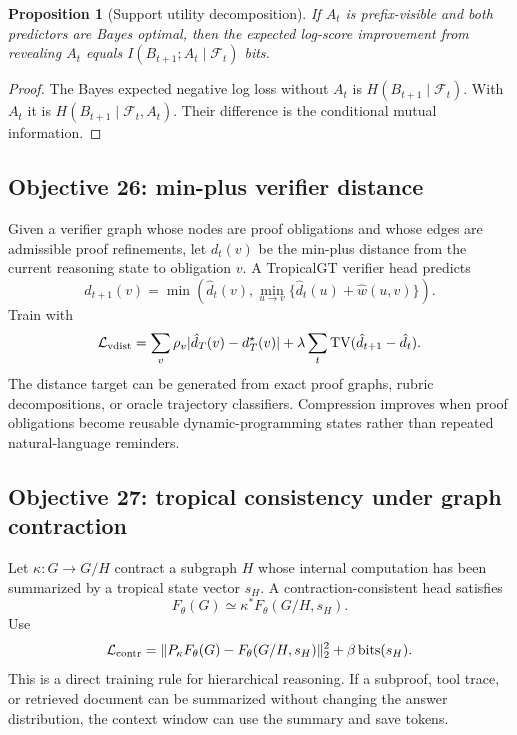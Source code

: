 \documentclass[11pt]{article}
\newtheorem{proposition}[definition]{Proposition}
\newcommand{\calL}{\mathcal{L}}
\newcommand{\calF}{\mathcal{F}}
\begin{document}
\begin{proposition}[Support utility decomposition]
If $A_t$ is prefix-visible and both predictors are Bayes optimal, then the expected log-score improvement from revealing $A_t$ equals $I(B_{t+1};A_t\mid\calF_t)$ bits.
\end{proposition}
\begin{proof}
The Bayes expected negative log loss without $A_t$ is $H(B_{t+1}\mid\calF_t)$. With $A_t$ it is $H(B_{t+1}\mid\calF_t,A_t)$. Their difference is the conditional mutual information.
\end{proof}

\subsection{Objective 26: min-plus verifier distance}
Given a verifier graph whose nodes are proof obligations and whose edges are admissible proof refinements, let $d_t(v)$ be the min-plus distance from the current reasoning state to obligation $v$. A TropicalGT verifier head predicts
\begin{equation}
\hat d_{t+1}(v)=\min\left(\hat d_t(v),\min_{u\to v}\{\hat d_t(u)+\hat w(u,v)\}\right).
\end{equation}
Train with
\begin{equation}
\calL_{\rm vdist}=\sum_v \rho_v |\hat d_T(v)-d_T^\star(v)|+\lambda\sum_t \operatorname{TV}(\hat d_{t+1}-\hat d_t).
\end{equation}
The distance target can be generated from exact proof graphs, rubric decompositions, or oracle trajectory classifiers. Compression improves when proof obligations become reusable dynamic-programming states rather than repeated natural-language reminders.

\subsection{Objective 27: tropical consistency under graph contraction}
Let $\kappa:G\to G/H$ contract a subgraph $H$ whose internal computation has been summarized by a tropical state vector $s_H$. A contraction-consistent head satisfies
\begin{equation}
F_\theta(G)\simeq \kappa^\ast F_\theta(G/H,s_H).
\end{equation}
Use
\begin{equation}
\calL_{\rm contr}=\|P_\kappa F_\theta(G)-F_\theta(G/H,s_H)\|_2^2+\beta\operatorname{bits}(s_H).
\end{equation}
This is a direct training rule for hierarchical reasoning. If a subproof, tool trace, or retrieved document can be summarized without changing the answer distribution, the context window can use the summary and save tokens.
\end{document}
